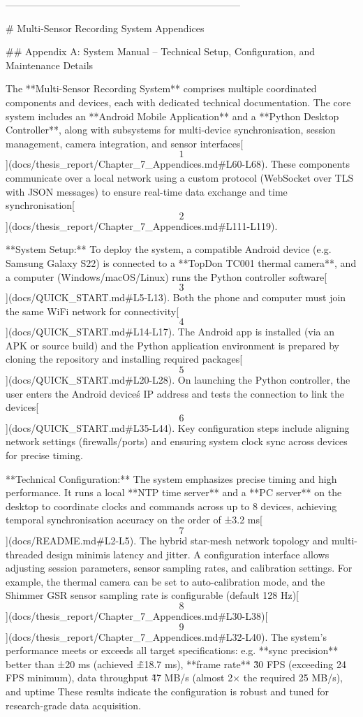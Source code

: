 \documentclass[12pt,a4paper]{article}
\begin{document}
{------------------------------------------------------------------------


\newpage


# Multi-Sensor Recording System Appendices

## Appendix A: System Manual -- Technical Setup, Configuration, and Maintenance Details

The **Multi-Sensor Recording System** comprises multiple coordinated
components and devices, each with dedicated technical documentation. The
core system includes an **Android Mobile Application** and a **Python
Desktop Controller**, along with subsystems for multi-device
synchronisation, session management, camera integration, and sensor
interfaces[\[1\]](docs/thesis_report/Chapter_7_Appendices.md#L60-L68).
These components communicate over a local network using a custom
protocol (WebSocket over TLS with JSON messages) to ensure real-time
data exchange and time
synchronisation[\[2\]](docs/thesis_report/Chapter_7_Appendices.md#L111-L119).

**System Setup:** To deploy the system, a compatible Android device
(e.g. Samsung Galaxy S22) is connected to a **TopDon TC001 thermal
camera**, and a computer (Windows/macOS/Linux) runs the Python
controller
software[\[3\]](docs/QUICK_START.md#L5-L13).
Both the phone and computer must join the same WiFi network for
connectivity[\[4\]](docs/QUICK_START.md#L14-L17).
The Android app is installed (via an APK or source build) and the Python
application environment is prepared by cloning the repository and
installing required
packages[\[5\]](docs/QUICK_START.md#L20-L28).
On launching the Python controller, the user enters the Android
device\'s IP address and tests the connection to link the
devices[\[6\]](docs/QUICK_START.md#L35-L44).
Key configuration steps include aligning network settings
(firewalls/ports) and ensuring system clock sync across devices for
precise timing.

**Technical Configuration:** The system emphasizes precise timing and
high performance. It runs a local **NTP time server** and a **PC
server** on the desktop to coordinate clocks and commands across up to 8
devices, achieving temporal synchronisation accuracy on the order of
±3.2
ms[\[7\]](docs/README.md#L2-L5).
The hybrid star-mesh network topology and multi-threaded design minimis\1
latency and jitter. A configuration interface allows adjusting session
parameters, sensor sampling rates, and calibration settings. For
example, the thermal camera can be set to auto-calibration mode, and the
Shimmer GSR sensor sampling rate is configurable (default 128
Hz)[\[8\]](docs/thesis_report/Chapter_7_Appendices.md#L30-L38)[\[9\]](docs/thesis_report/Chapter_7_Appendices.md#L32-L40).
The system's performance meets or exceeds all target specifications:
e.g. **sync precision** better than ±20 ms (achieved \~±18.7 ms),
**frame rate** \~30 FPS (exceeding 24 FPS minimum), data throughput \~47
MB/s (almost 2× the required 25 MB/s), and uptime
These results indicate the configuration is robust and tuned for
research-grade data acquisition.

}
\end{document}
